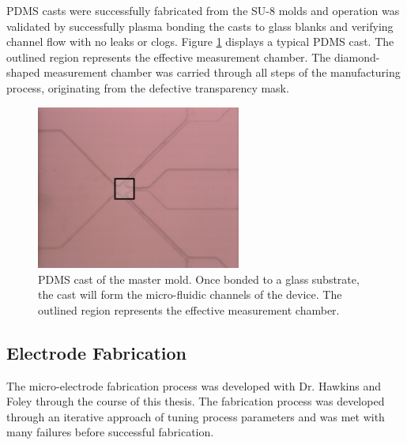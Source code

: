 \FloatBarrier

\par PDMS casts were successfully fabricated from the SU-8 molds and operation was validated by successfully plasma bonding the casts to glass blanks and verifying channel flow with no leaks or clogs. Figure \ref{fig:pdms_results} displays a typical PDMS cast. The outlined region represents the effective measurement chamber. The diamond-shaped measurement chamber was carried through all steps of the manufacturing process, originating from the defective transparency mask.

\begin{figure}[H]
    \centering
    \includegraphics[width=0.6\textwidth]{images/pdms_channels_outline.png}
    \caption[PDMS cast of the master mold]{PDMS cast of the master mold. Once bonded to a glass substrate, the cast will form the micro-fluidic channels of the device. The outlined region represents the effective measurement chamber.}
    \label{fig:pdms_results}
\end{figure}

\FloatBarrier


\subsection{Electrode Fabrication}

\par The micro-electrode fabrication process was developed with Dr. Hawkins and Foley through the course of this thesis. The fabrication process was developed through an iterative approach of tuning process parameters and was met with many failures before successful fabrication.

